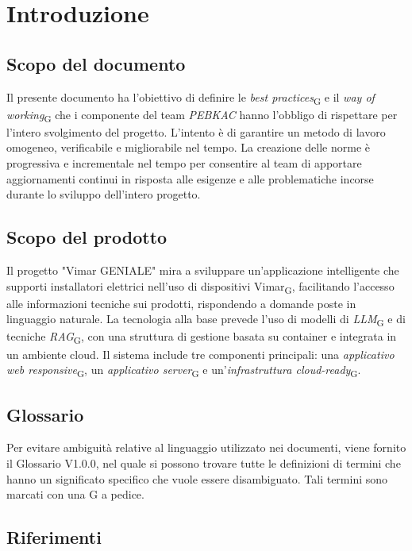 \section{Introduzione}
\subsection{Scopo del documento}
Il presente documento ha l’obiettivo di definire le \textit{best practices}\textsubscript{G}  e il \textit{way of working}\textsubscript{G} che i componente del team \textit{PEBKAC} hanno l’obbligo di rispettare per l’intero svolgimento del progetto. L'intento è di garantire un metodo di lavoro omogeneo, verificabile
e migliorabile nel tempo. La creazione delle norme è progressiva e incrementale nel tempo per consentire al team di apportare aggiornamenti continui in risposta alle esigenze e alle problematiche incorse durante lo sviluppo dell'intero progetto.

\subsection{Scopo del prodotto}
Il progetto "Vimar GENIALE" mira a sviluppare un'applicazione intelligente che supporti installatori elettrici nell'uso di dispositivi Vimar\textsubscript{G}, facilitando l'accesso alle informazioni tecniche sui prodotti, rispondendo a domande poste in linguaggio naturale.
La tecnologia alla base prevede l'uso di modelli di \textit{LLM}\textsubscript{G} e di tecniche \textit{RAG}\textsubscript{G}, con una struttura di gestione basata su container e integrata in un ambiente cloud.
Il sistema include tre componenti principali: una \textit{applicativo web responsive}\textsubscript{G}, un \textit{applicativo server}\textsubscript{G} e un'\textit{infrastruttura cloud-ready}\textsubscript{G}. 
\subsection{Glossario}
Per evitare ambiguità relative al linguaggio utilizzato nei documenti, viene fornito il Glossario V1.0.0, nel quale si possono trovare tutte le definizioni di termini che hanno un significato specifico che vuole essere disambiguato. Tali termini sono marcati con una G a pedice. 
\subsection{Riferimenti}
